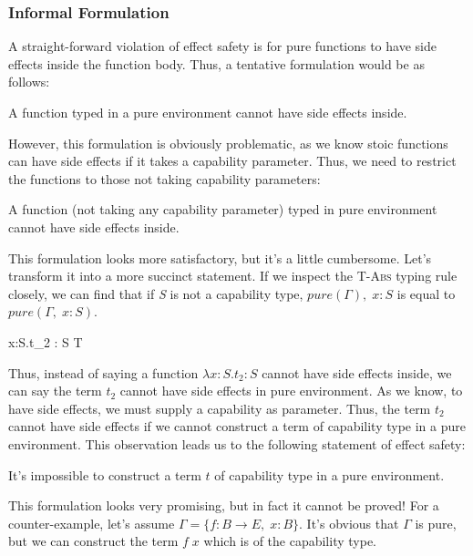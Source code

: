 \subsubsection{Informal Formulation}

A straight-forward violation of effect safety is for pure functions to
have side effects inside the function body. Thus, a tentative
formulation would be as follows:

\begin{definition}
A function typed in a pure environment cannot have side effects inside.
\end{definition}

However, this formulation is obviously problematic, as we know stoic
functions can have side effects if it takes a capability
parameter. Thus, we need to restrict the functions to those not taking
capability parameters:

\begin{definition}
  A function (not taking any capability parameter) typed in pure
  environment cannot have side effects inside.
\end{definition}

This formulation looks more satisfactory, but it's a little
cumbersome. Let's transform it into a more succinct statement. If we
inspect the \textsc{T-Abs} typing rule closely, we can find that if
\emph{S} is not a capability type, $pure(\Gamma),\; x: S$ is equal to
$pure(\Gamma,\; x: S)$.

{ \Gamma \vdash \lambda x:S.\;t_2 : S \to T }

Thus, instead of saying a function $\lambda x:S.t_2 : S$ cannot have
side effects inside, we can say the term $t_2$ cannot have side
effects in pure environment. As we know, to have side effects, we must
supply a capability as parameter. Thus, the term $t_2$ cannot have
side effects if we cannot construct a term of capability type in a
pure environment. This observation leads us to the following statement
of effect safety:

\begin{definition}
  It's impossible to construct a term $t$ of capability type in a pure
  environment.
\end{definition}

This formulation looks very promising, but in fact it cannot be proved!
For a counter-example, let's assume $\Gamma = \{f: B \to E, \; x:
B\}$. It's obvious that $\Gamma$ is pure, but we can construct the
term $f \; x$ which is of the capability type.


